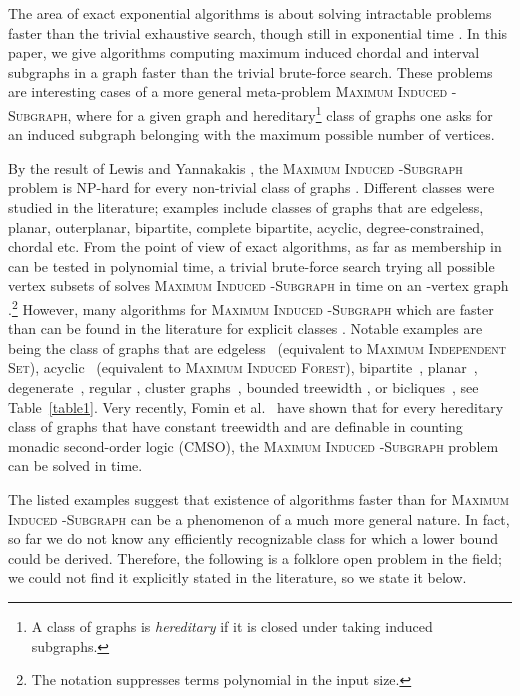 

The area of exact exponential algorithms is about   solving  intractable  problems  faster than the trivial exhaustive search, though still in exponential time  \cite{FominKratschbook10}.  
In this paper, we give  algorithms computing maximum induced chordal and interval subgraphs in a graph faster than the trivial brute-force search. These problems are interesting cases of a more general meta-problem \textsc{Maximum Induced -Subgraph}, where for a given graph  and hereditary\footnote{A class of graphs is {\em{hereditary}} if it is closed under taking induced subgraphs.} class of graphs  one asks for an induced subgraph belonging  with the maximum possible number of vertices.

By the result of Lewis  and Yannakakis \cite{LewisY80}, the \textsc{Maximum Induced -Subgraph} problem is NP-hard for every non-trivial class of graphs . 
Different classes  were studied in the literature; examples include classes of graphs that are edgeless, planar, outerplanar, bipartite, complete bipartite, acyclic, degree-constrained, chordal etc. From the point of view of exact algorithms, as far as membership in  can be tested in polynomial time, a trivial brute-force search trying all possible vertex subsets of  solves  
\textsc{Maximum Induced -Subgraph} in time  on an -vertex graph .\footnote{The  notation suppresses terms polynomial in the input size.}  
However, many algorithms for \textsc{Maximum Induced -Subgraph} which are faster than  can be found in the literature for explicit classes . 
Notable examples are  being the class of graphs that are edgeless~\cite{Robson86} (equivalent to \textsc{Maximum Independent Set}), acyclic~\cite{FominGPR08-On} (equivalent to \textsc{Maximum Induced Forest}), bipartite~\cite{RamanSS07}, planar~\cite{FominTV11}, degenerate~\cite{PilipczukP12}, regular \cite{GuptaRS12},  cluster graphs~\cite{FominGKLS10}, bounded treewidth \cite{Fomin:2010ys}, or bicliques~\cite{GaspersKL12}, see Table~\ref{table1}. Very recently, Fomin et al.~\cite{FominTV13} have shown that for every hereditary class of graphs  that have constant treewidth and are definable in counting monadic second-order logic (CMSO), the \textsc{Maximum Induced -Subgraph} problem can be solved in  time.

The listed examples suggest that existence of algorithms faster than  for \textsc{Maximum Induced -Subgraph} can be a phenomenon of a much more general nature. In fact, so far we do not know any efficiently recognizable class  for which a lower bound could be derived. Therefore,   the following   is a folklore open problem in the field; we could not find it  explicitly stated in the literature, so we state it below.

